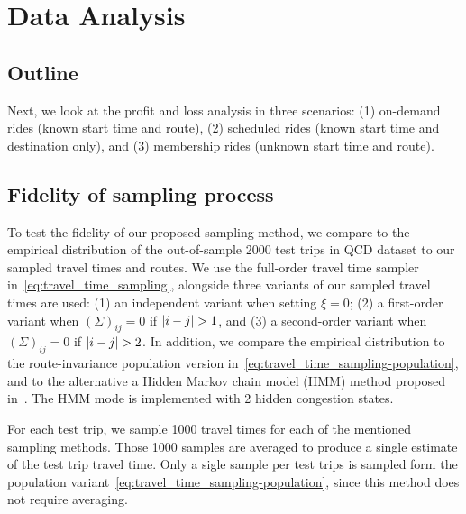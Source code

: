 \documentclass[12pt]{article}
\begin{document}
{{{{{{\section{Data Analysis}
\subsection{Outline}
Next, we look at the profit and loss analysis in three scenarios: (1) on-demand rides (known start time and route), (2) scheduled rides (known start time and destination only), and (3) membership rides (unknown start time and route).  

\subsection{Fidelity of sampling process} \label{sec:fedelity}
To test the fidelity of our proposed sampling method, we compare to the empirical distribution of the out-of-sample 2000 test trips in QCD dataset to our sampled travel times and routes. We use the full-order travel time sampler in~\eqref{eq:travel_time_sampling}, alongside three variants of our sampled travel times are used: (1) an independent variant when setting $\xi = 0$; (2) a first-order variant when $(\Sigma)_{ij} =0$ if $\abr{i-j}>1$, and (3) a second-order variant when $(\Sigma)_{ij} =0$ if $\abr{i-j}>2$. In addition, we compare the empirical distribution to the route-invariance population version in~\eqref{eq:travel_time_sampling-population}, and to the alternative a Hidden Markov chain model (HMM) method proposed in~\cite[Algo. 2]{woodard2017predicting}. The HMM mode is implemented with 2 hidden congestion states. 

For each test trip, we sample 1000 travel times for each of the mentioned sampling methods. Those 1000 samples are averaged to produce a single estimate of the test trip travel time. Only a sigle sample per test trips is sampled form the population variant~\eqref{eq:travel_time_sampling-population}, since this method does not require averaging. 

}}}}}}
\end{document}
